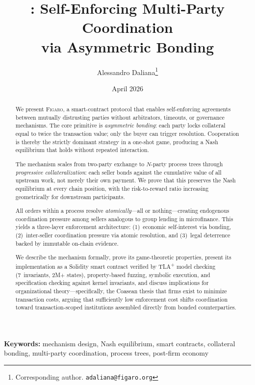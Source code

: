 \documentclass[11pt,a4paper]{article}
\title{%
  \figaro: Self-Enforcing Multi-Party Coordination\\
  via Asymmetric Bonding%
}
\author{
  Alessandro Daliana\thanks{Corresponding author. \texttt{adaliana@figaro.org}}
}
\date{April 2026}
\theoremstyle{definition}
\theoremstyle{remark}
\newcommand{\figaro}{\textsc{Figaro}}
\begin{document}
\maketitle

\begin{abstract}
We present \figaro, a smart-contract protocol that enables self-enforcing
agreements between mutually distrusting parties without arbitrators,
timeouts, or governance mechanisms. The core primitive is
\emph{asymmetric bonding}: each party locks collateral equal to twice the
transaction value; only the buyer can trigger resolution. Cooperation is
thereby the strictly dominant strategy in a one-shot game, producing a
Nash equilibrium that holds without repeated interaction.

The mechanism scales from two-party exchange to $N$-party process trees
through \emph{progressive collateralization}: each seller bonds against
the cumulative value of all upstream work, not merely their own payment.
We prove that this preserves the Nash equilibrium at every chain
position, with the risk-to-reward ratio increasing geometrically for
downstream participants.

All orders within a process resolve \emph{atomically}---all or
nothing---creating endogenous coordination pressure among sellers
analogous to group lending in microfinance. This yields a three-layer
enforcement architecture: (1)~economic self-interest via bonding,
(2)~inter-seller coordination pressure via atomic resolution, and
(3)~legal deterrence backed by immutable on-chain evidence.

We describe the mechanism formally, prove its game-theoretic properties,
present its implementation as a Solidity smart contract verified
by TLA\textsuperscript{+} model checking (7~invariants, 2M+ states),
property-based fuzzing, symbolic execution, and specification
checking against kernel invariants, and
discuss implications for organizational theory---specifically, the
Coasean thesis that firms exist to minimize transaction costs, arguing
that sufficiently low enforcement cost shifts coordination toward
transaction-scoped institutions assembled directly from bonded
counterparties.

\end{abstract}

\medskip
\noindent\textbf{Keywords:}
mechanism design, Nash equilibrium, smart contracts, collateral bonding,
multi-party coordination, process trees, post-firm economy
\end{document}
